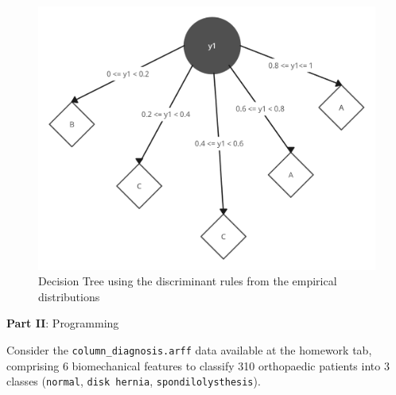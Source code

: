 \documentclass[12pt]{article}
\begin{document}
\begin{enumerate}[leftmargin=\labelsep]
    \begin{figure}[H]
        \centering
        \includegraphics[width=12cm]{./assets/decision_tree_ex5_PartI.png}
        \caption{Decision Tree using the discriminant rules from the empirical distributions}
        \label{fig:decision-tree-root-split}
    \end{figure}

\end{enumerate}

\vskip 0.5cm

\begin{center}
\large{\textbf{Part II}: Programming}\normalsize
\end{center}

\noindent Consider the \texttt{column\_diagnosis.arff} data available at the homework tab, comprising 6 biomechanical
features to classify 310 orthopaedic patients into 3 classes (\texttt{normal}, \texttt{disk hernia}, \texttt{spondilolysthesis}).
\end{document}
